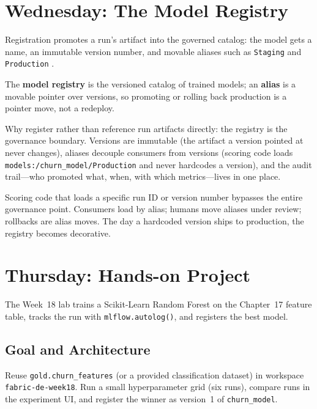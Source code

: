 \section{Wednesday: The Model Registry}
Registration promotes a run's artifact into the governed catalog: the model gets a name, an immutable version number, and movable aliases such as \texttt{Staging} and \texttt{Production} \cite{microsoftMlflowFabric,mlflowDocs}.

\begin{definitionbox}
The \textbf{model registry} is the versioned catalog of trained models; an \textbf{alias} is a movable pointer over versions, so promoting or rolling back production is a pointer move, not a redeploy.
\end{definitionbox}

Why register rather than reference run artifacts directly: the registry is the governance boundary. Versions are immutable (the artifact a version pointed at never changes), aliases decouple consumers from versions (scoring code loads \texttt{models:/churn\_model/Production} and never hardcodes a version), and the audit trail---who promoted what, when, with which metrics---lives in one place.

\begin{pitfall}
Scoring code that loads a specific run ID or version number bypasses the entire governance point. Consumers load by alias; humans move aliases under review; rollbacks are alias moves. The day a hardcoded version ships to production, the registry becomes decorative.
\end{pitfall}

\section{Thursday: Hands-on Project}
The Week~18 lab trains a Scikit-Learn Random Forest on the Chapter~17 feature table, tracks the run with \texttt{mlflow.autolog()}, and registers the best model.

\subsection{Goal and Architecture}
Reuse \texttt{gold.churn\_features} (or a provided classification dataset) in workspace \texttt{fabric-de-week18}. Run a small hyperparameter grid (six runs), compare runs in the experiment UI, and register the winner as version~1 of \texttt{churn\_model}.

